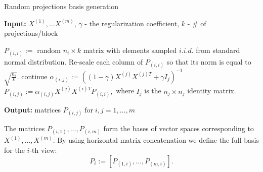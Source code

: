 \begin{algorithm}
\caption{Random projections basis generation}
\label{algorithm:rpgen}
{\bf Input:} $X^{(1)},\ldots X^{(m)}$, $\gamma$ - the regularization coefficient, $k$ - \# of projections/block
\begin{algorithmic}
\STATE $P_{(i,i)} :=$ random $n_i \times k$ matrix with elements sampled $i.i.d.$ from standard normal distribution.
\STATE Re-scale each column of $P_{(i,i)}$ so that its norm is equal to $\sqrt{\frac{n_i}{k}}$.
 \STATE continue
\ENDIF
\STATE  $\alpha_{(i,j)} :=  \left(\left(1-\gamma\right) X^{(j)} X^{(j)T} + \gamma  I_j \right)^{-1}$
\STATE  $P_{(i,j)} :=  \alpha_{(i,j)} X^{(j)} X^{(i)T}  P_{(i,i)},$ where $I_j$ is the $n_j \times n_j$ identity matrix.
\ENDFOR
\ENDFOR
\\
\end{algorithmic}
{\bf Output:} matrices $P_{(i,j)} \;\text{for}\; i,j = 1,\ldots,m$
\end{algorithm}
\begin{sloppypar}
The matrices $P_{(i,1)}, \ldots, P_{(i,m)}$ form the bases of
vector spaces corresponding to $X^{(1)},\ldots, X^{(m)}$. By using horizontal
matrix concatenation we define the full basis for the $i$-th view:
\begin{equation}\label{eq:rp_projectors}
P_i := \left[P_{(1,i)}, \ldots, P_{(m,i)}\right].
\end{equation}
\end{sloppypar}

